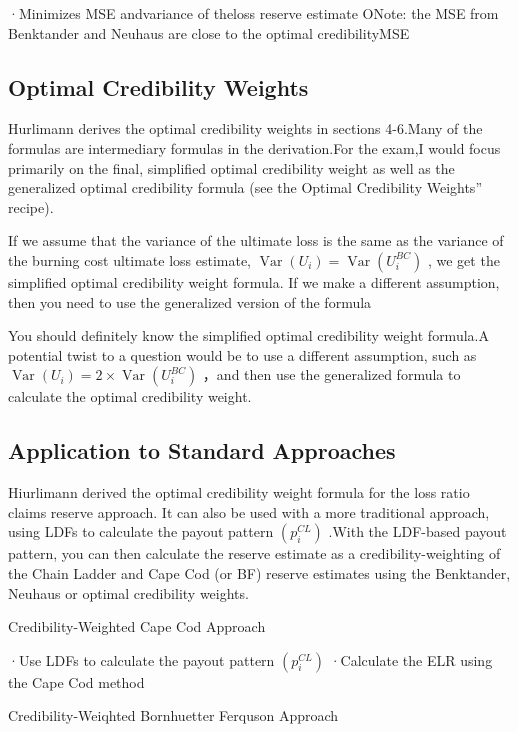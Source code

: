 \documentclass[
]{article}
\begin{document}
·Minimizes MSE andvariance of theloss reserve estimate ONote: the MSE
from Benktander and Neuhaus are close to the optimal credibilityMSE

\subsection{Optimal Credibility
Weights}\label{optimal-credibility-weights}

Hurlimann derives the optimal credibility weights in sections 4-6.Many
of the formulas are intermediary formulas in the derivation.For the
exam,I would focus primarily on the final, simplified optimal
credibility weight as well as the generalized optimal credibility
formula (see the Optimal Credibility Weights'' recipe).

If we assume that the variance of the ultimate loss is the same as the
variance of the burning cost ultimate loss estimate,
\(\operatorname{Var}(U_{i})=\operatorname{Var}(U_{i}^{BC})\) , we get
the simplified optimal credibility weight formula. If we make a
different assumption, then you need to use the generalized version of
the formula

You should definitely know the simplified optimal credibility weight
formula.A potential twist to a question would be to use a different
assumption, such as
\(\operatorname{Var}(U_{i})=2\times\operatorname{Var}(U_{i}^{BC})\)
，and then use the generalized formula to calculate the optimal
credibility weight.

\subsection{Application to Standard
Approaches}\label{application-to-standard-approaches}

Hiurlimann derived the optimal credibility weight formula for the loss
ratio claims reserve approach. It can also be used with a more
traditional approach, using LDFs to calculate the payout pattern
\((p_{i}^{CL})\) .With the LDF-based payout pattern, you can then
calculate the reserve estimate as a credibility-weighting of the Chain
Ladder and Cape Cod (or BF) reserve estimates using the Benktander,
Neuhaus or optimal credibility weights.

Credibility-Weighted Cape Cod Approach

·Use LDFs to calculate the payout pattern \((p_{i}^{CL})\) ·Calculate
the ELR using the Cape Cod method

Credibility-Weiqhted Bornhuetter Ferquson Approach
\end{document}
